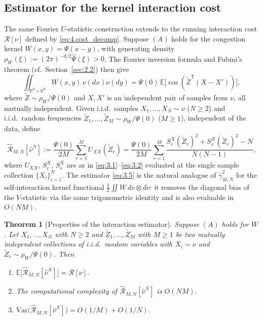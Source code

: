 \documentclass[11pt,leqno]{article}
\theoremstyle{plain}
\newtheorem{thm}{Theorem}[section]
\theoremstyle{remark}
\theoremstyle{definition}
\numberwithin{equation}{section}
\numberwithin{figure}{section}
\numberwithin{table}{section}
\numberwithin{algorithm}{section}
\newcommand{\EE}{\mathbb{E}}
\newcommand{\RR}{\mathbb{R}}
\begin{document}
\subsection{Estimator for the kernel interaction cost}\label{sec:3.1interaction}

The same Fourier $U$-statistic construction extends to the running interaction cost $\mathcal{R}[\nu]$ defined by \eqref{eq:4.cost_decomp}.
Suppose $(A)$ holds for the congestion kernel $W(x,y) = \Psi(x-y)$,
with generating density $\rho_W(\xi):=(2\pi)^{-d/2}\widehat{\Psi}(\xi)>0$.
The Fourier inversion formula and Fubini's theorem (cf.\ Section~\ref{sec:2.2}) then give
\begin{equation}\label{eq:repre_R}
 \iint\nolimits_{\RR^d\times\RR^d} W(x,y)\,\nu(dx)\nu(dy)
 = \Psi(0)\,\EE\bigl[\cos(\tilde Z^{\mathsf{T}}(X-X'))\bigr],
\end{equation}
where $\tilde Z\sim \rho_W/\Psi(0)$ and $X,X'$ is an independent pair of samples from $\nu$,
all mutually independent.
Given i.i.d.\ samples $X_1,\ldots,X_N\sim\nu$ ($N\ge 2$)
and i.i.d.\ random frequencies $\tilde Z_1,\ldots,\tilde Z_M\sim\rho_W/\Psi(0)$ ($M\ge 1$),
independent of the data, define
\begin{equation}\label{eq:3.5}
 \hat{\mathcal{R}}_{M,N}[\hat\nu^N]
 := \frac{\Psi(0)}{2M}\sum_{r=1}^M U_{XX}(\tilde Z_r)
 = \frac{\Psi(0)}{2M}\sum_{r=1}^M\frac{S_c^X(\tilde Z_r)^2+S_s^X(\tilde Z_r)^2-N}{N(N-1)},
\end{equation}
where $U_{XX}$, $S_c^X$, $S_s^X$ are as in \eqref{eq:3.1}--\eqref{eq:3.2}
evaluated at the single sample collection $\{X_i\}_{i=1}^N$.
The estimator \eqref{eq:3.5} is the natural analogue of $\hat\gamma_{M,N}^2$ for the
self-interaction kernel functional $\frac{1}{2}\iint W\,d\nu\otimes d\nu$:
it removes the diagonal bias of the $V$-statistic via the same trigonometric identity
and is also evaluable in $O(NM)$.

\begin{thm}[Properties of the interaction estimator]\label{thm:rfu_interaction}
Suppose $(A)$ holds for $W$.
Let $X_1,\ldots,X_N$ with $N\ge 2$ and $\tilde Z_1,\ldots,\tilde Z_M$ with $M\ge 1$
be two mutually independent collections of i.i.d.\ random variables
with $X_i\sim\nu$ and $\tilde Z_r\sim\rho_W/\Psi(0)$. Then
\begin{enumerate}[label=\textup{(\roman*)}]
\item $\EE\bigl[\hat{\mathcal{R}}_{M,N}[\hat\nu^N]\bigr] = \mathcal{R}[\nu]$.
\item The computational complexity of $\hat{\mathcal{R}}_{M,N}[\hat\nu^N]$ is $O(NM)$.
\item $\mathrm{Var}\bigl(\hat{\mathcal{R}}_{M,N}[\hat\nu^N]\bigr) = O(1/M) + O(1/N)$.
\end{enumerate}
\end{thm}
\end{document}
